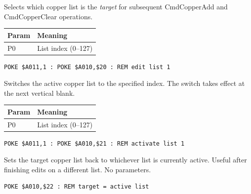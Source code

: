 

Selects which copper list is the \emph{target} for subsequent CmdCopperAdd
and CmdCopperClear operations.

\begin{center}
\small
\begin{tabular}{@{}ll@{}}
\toprule
\textbf{Param} & \textbf{Meaning} \\
\midrule
P0 & List index (0--127) \\
\bottomrule
\end{tabular}
\end{center}

\begin{lstlisting}
POKE $A011,1 : POKE $A010,$20 : REM edit list 1
\end{lstlisting}



Switches the active copper list to the specified index.  The switch takes
effect at the next vertical blank.

\begin{center}
\small
\begin{tabular}{@{}ll@{}}
\toprule
\textbf{Param} & \textbf{Meaning} \\
\midrule
P0 & List index (0--127) \\
\bottomrule
\end{tabular}
\end{center}

\begin{lstlisting}
POKE $A011,1 : POKE $A010,$21 : REM activate list 1
\end{lstlisting}



Sets the target copper list back to whichever list is currently active.
Useful after finishing edits on a different list.  No parameters.

\begin{lstlisting}
POKE $A010,$22 : REM target = active list
\end{lstlisting}


